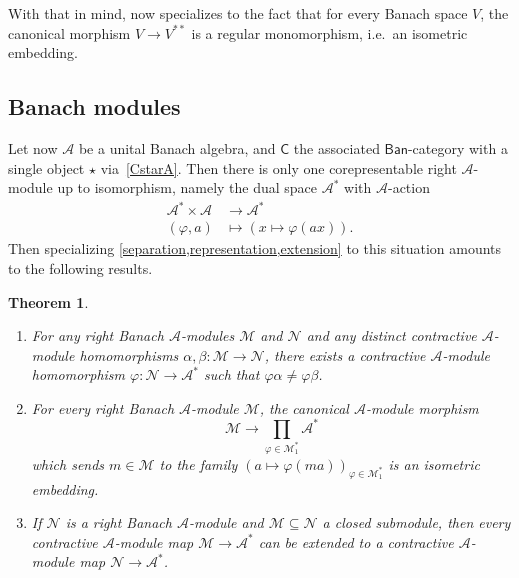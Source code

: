 \documentclass[11pt,onecolumn]{article}
\newcommand{\cC}{\mathsf{C}}
\newcommand{\Ban}{\mathsf{Ban}}
\theoremstyle{plain}
\newtheorem{theorem}{Theorem}[subsection]
\theoremstyle{remark}
\theoremstyle{definition}
\begin{document}
With that in mind,  now specializes to the fact that for every Banach space $V$,
the canonical morphism $V \to V^{**}$ is a regular monomorphism, i.e.~an isometric embedding.

\subsection{Banach modules}

Let now $\mathcal{A}$ be a unital Banach algebra, and $\cC$ the associated $\Ban$-category with a single object $\star$ via~\eqref{CstarA}.
Then there is only one corepresentable right $\mathcal{A}$-module up to isomorphism, namely the dual space $\mathcal{A}^*$ with $\mathcal{A}$-action
\begin{align*}
	\mathcal{A}^* \times \mathcal{A} & \longrightarrow \mathcal{A}^* \\
	(\varphi, a) & \longmapsto (x \mapsto \varphi(ax)).
\end{align*}
Then specializing \cref{separation,representation,extension} to this situation amounts to the following results.

\begin{theorem}
	\label{thm:banach_modules}
	\begin{enumerate}
		\item For any right Banach $\mathcal{A}$-modules $\mathcal{M}$ and $\mathcal{N}$ and any distinct contractive $\mathcal{A}$-module homomorphisms $\alpha,\beta \colon \mathcal{M} \to \mathcal{N}$, there exists a contractive $\mathcal{A}$-module homomorphism $\varphi \colon \mathcal{N} \to \mathcal{A}^*$ such that $\varphi\alpha \neq \varphi\beta$.
		\item For every right Banach $\mathcal{A}$-module $\mathcal{M}$, the canonical $\mathcal{A}$-module morphism
			\begin{equation}
				\label{representation_banach}
				\mathcal{M} \longrightarrow \prod_{\varphi \in \mathcal{M}_1^*} \mathcal{A}^*
			\end{equation}
			which sends $m \in \mathcal{M}$ to the family $(a \mapsto \varphi(ma))_{\varphi \in \mathcal{M}_1^*}$
			is an isometric embedding.
		\item If $\mathcal{N}$ is a right Banach $\mathcal{A}$-module and $\mathcal{M} \subseteq \mathcal{N}$ a closed submodule, then every contractive $\mathcal{A}$-module map $\mathcal{M} \to \mathcal{A}^*$ can be extended to a contractive $\mathcal{A}$-module map $\mathcal{N} \to \mathcal{A}^*$.
	\end{enumerate}
\end{theorem}
\end{document}
